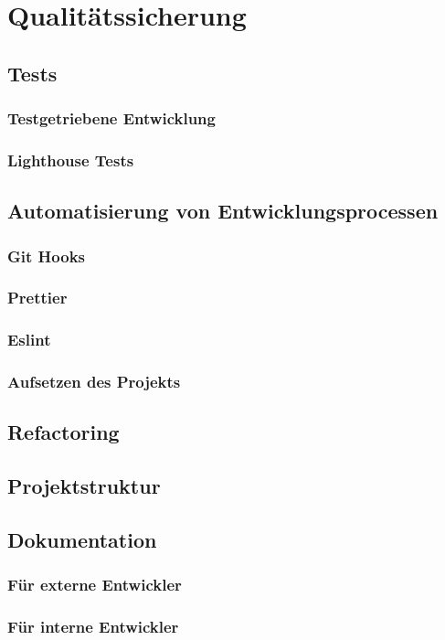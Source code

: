\chapter{Qualitätssicherung}

\section{Tests}

\subsection{Testgetriebene Entwicklung}

\subsection{Lighthouse Tests}

\section{Automatisierung von Entwicklungsprocessen}
\subsection{Git Hooks}
\subsection{Prettier}
\subsection{Eslint}
\subsection{Aufsetzen des Projekts}

\section{Refactoring}

\section{Projektstruktur}

\section{Dokumentation}
\subsection{Für externe Entwickler}
\subsection{Für interne Entwickler}
